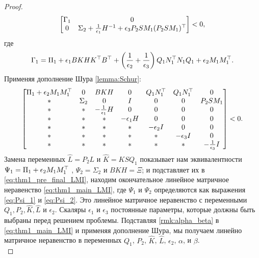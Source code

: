 \begin{proof}
	\begin{equation}
		\label{eq:thm1_LMI_after_Young}
		\begin{bmatrix}
			{\Gamma}_1  & 0  \\
			0 & {\Sigma}_2 +\frac{1}{\epsilon_1}{H}^{-1} +\epsilon_3 {P}_2{S}{M}_1({P}_2{S}{M}_1)^\top
		\end{bmatrix}<0,
	\end{equation}
	где
	\begin{equation}
		\label{eq:thm1_pre_final_LMI_Gamma}
		{\Gamma}_1={\Pi}_1 +\epsilon_1{BKH}{K}^\top{B}^\top+ \left(\frac{1}{\epsilon_2}+\frac{1}{\epsilon_3} \right){Q}_1{N}_1^\top{N}_1{Q}_1 + \epsilon_2 {M}_1{M}_1^\top.
	\end{equation}
	Применяя дополнение Шура \ref{lemma:Schur}:
	\begin{equation}
		\label{eq:thm1_pre_final_LMI}
		\begin{bmatrix}
			{\Pi}_1 +\epsilon_2{M}_1{M}_1^\top & 0 & {BKH} & 0 &  {Q}_1{N}_1^\top & {Q}_1{N}_1^\top & 0\\
			* & {\Sigma}_2 & 0 & {I} & 0 & 0 & {P}_2{S}{M}_1\\
			* & * &  -\frac{1}{\epsilon_1}{H} & 0 & 0 &0 & 0\\
			* & * & * & -\epsilon_1{H} & 0 & 0 & 0 \\
			* & * & * & * & -\epsilon_2 {I} & 0 & 0 \\       * & * & * & * & *& -\epsilon_3 {I} & 0 \\
			* & * & * & * & *& * & -\frac{1}{\epsilon_3} {I}\\
		\end{bmatrix} <0.
	\end{equation}
	Замена переменных $\hat{{L}}={P}_2{L}$ и $\hat{{K}}={KS}{Q}_1$
	показывает нам эквивалентности ${\Psi}_1={\Pi}_1+\epsilon_2{M}_1{M}_1^\top$ , ${\Psi}_2={\Sigma}_2$ и ${BKH}={\Xi}$; и подставляет их в \eqref{eq:thm1_pre_final_LMI}, находим окончательное линейное матричное неравенство \eqref{eq:thm1_main_LMI}, 
	где ${\Psi}_1$ и ${\Psi}_2$ определяются как выражения \eqref{eq:Psi_1} и \eqref{eq:Psi_2}.
	Это линейное матричное неравенство с переменными ${Q}_1,{P}_2, \hat{{K}},\hat{{L}}$ и $\epsilon_2$. Скаляры $\epsilon_1$ и $\epsilon_3$ постоянные параметры, которые должны быть выбраны перед решением проблемы.
Подставляя \ref{rmk:alpha_beta} в \eqref{eq:thm1_main_LMI} и применяя дополнение Шура, мы получаем линейно матричное неравенство в переменных 
${Q}_1$, ${P}_2$, $\hat{{K}}$, $\hat{{L}}$, $\epsilon_2$, $\alpha$, и $\beta$.
%
\begin{equation}

\end{equation}
\end{proof}

